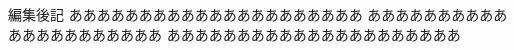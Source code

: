 \documentclass[uplatex,dvipdfmx]{vkaishi}
\begin{document}
\author[優木]{せつ菜}
\date{\today}

\begin{preface}{編集後記}
  あああああああああああああああああああああ
  あああああああああああああああああああああ
  あああああああああああああああああああああ
\end{preface}
\end{document}
